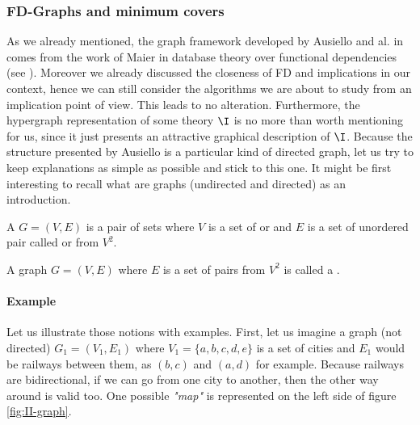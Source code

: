 \subsubsection{FD-Graphs and minimum covers}

As we already mentioned, the graph framework developed by Ausiello and al. in
\cite{ausiello_graph_1983, ausiello_minimal_1986} comes from the work of Maier
in database theory over functional dependencies (see \cite{maier_theory_1983}).
Moreover we already discussed the closeness of FD and implications in our 
context, hence we can still consider the algorithms we are about to study from
an implication point of view. This leads to no alteration. Furthermore, the
hypergraph representation of some theory $\I$ is no more than worth mentioning
for us, since it just presents an attractive graphical description of $\I$.
Because the structure presented by Ausiello is a particular kind of directed
graph, let us try to keep explanations as simple as possible and stick to this
one. It might be first interesting to recall what are graphs (undirected and 
directed) as an introduction.

\begin{definition} A  $G = (V, E)$ is a pair
of sets where $V$ is a set of  or  and $E$ is
a set of unordered pair called  or  from $V^2$.
\end{definition}

\begin{definition} A graph $G = (V, E)$ where $E$ is
a set of  pairs from $V^2$ is called a .	
\end{definition}

\paragraph{Example} Let us illustrate those notions with examples. First, let us
imagine a graph (not directed) $G_1 = (V_1, E_1)$ where $V_1 = \{
a, b, c, d, e\}$ is a set of cities and
$E_1$ would be railways between them, as $(b, c)$ and $(a, d)$ for example. 
Because railways are bidirectional, if we can go from one city to another, then 
the other way around is valid too. One possible \textit{"map"} is represented 
on the left side of figure \ref{fig:II-graph}.

\begin{figure}[ht]
	
\end{figure}

